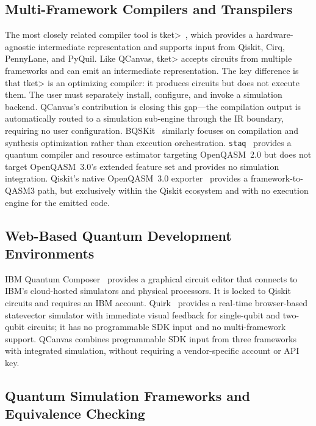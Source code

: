 \documentclass[runningheads]{llncs}
\begin{document}
\subsection{Multi-Framework Compilers and Transpilers}

The most closely related compiler tool is \textsf{t\textbar ket\textgreater}~\cite{sivarajah2020}, which provides a hardware-agnostic intermediate representation and supports input from Qiskit, Cirq, PennyLane, and PyQuil. Like QCanvas, \textsf{t\textbar ket\textgreater} accepts circuits from multiple frameworks and can emit an intermediate representation. The key difference is that \textsf{t\textbar ket\textgreater} is an optimizing compiler: it produces circuits but does not execute them. The user must separately install, configure, and invoke a simulation backend. QCanvas's contribution is closing this gap---the compilation output is automatically routed to a simulation sub-engine through the IR boundary, requiring no user configuration. BQSKit~\cite{bqskit2022} similarly focuses on compilation and synthesis optimization rather than execution orchestration. \texttt{staq}~\cite{staq2020} provides a quantum compiler and resource estimator targeting OpenQASM~2.0 but does not target OpenQASM~3.0's extended feature set and provides no simulation integration. Qiskit's native OpenQASM~3.0 exporter~\cite{qiskit2023} provides a framework-to-QASM3 path, but exclusively within the Qiskit ecosystem and with no execution engine for the emitted code.

\subsection{Web-Based Quantum Development Environments}

IBM Quantum Composer~\cite{ibmcomposer2024} provides a graphical circuit editor that connects to IBM's cloud-hosted simulators and physical processors. It is locked to Qiskit circuits and requires an IBM account. Quirk~\cite{gidney2017} provides a real-time browser-based statevector simulator with immediate visual feedback for single-qubit and two-qubit circuits; it has no programmable SDK input and no multi-framework support. QCanvas combines programmable SDK input from three frameworks with integrated simulation, without requiring a vendor-specific account or API key.

\subsection{Quantum Simulation Frameworks and Equivalence Checking}
\end{document}
